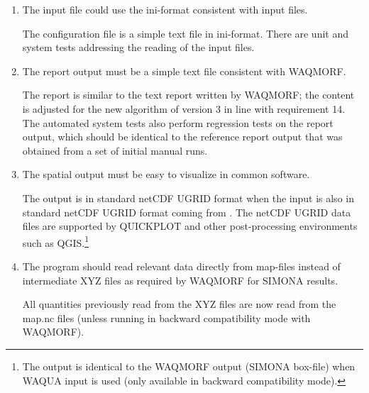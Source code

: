 \begin{enumerate}
\item \begin{requirement}
The input file could use the ini-format consistent with \dflowfm input files.
\end{requirement}
\begin{testmethod}
The \dfastmi configuration file is a simple text file in ini-format.
There are unit and system tests addressing the reading of the input files.
\end{testmethod}

\item \begin{requirement}
The report output must be a simple text file consistent with WAQMORF.
\end{requirement}
\begin{testmethod}
The report is similar to the text report written by WAQMORF; the content is adjusted for the new algorithm of \dfastmi version 3 in line with requirement 14.
The automated system tests also perform regression tests on the report output, which should be identical to the reference report output that was obtained from a set of initial manual runs.
\end{testmethod}

\item \begin{requirement}
The spatial output must be easy to visualize in common software.
\end{requirement}
\begin{testmethod}
The output is in standard netCDF UGRID format when the input is also in standard netCDF UGRID format coming from \dflowfm.
The netCDF UGRID data files are supported by QUICKPLOT and other post-processing environments such as QGIS.\footnote{The output is identical to the WAQMORF output (SIMONA box-file) when WAQUA input is used (only available in backward compatibility mode).}
\end{testmethod}

\item \begin{requirement}
The program should read relevant data directly from \dflowfm map-files instead of intermediate XYZ files as required by WAQMORF for SIMONA results.
\end{requirement}
\begin{testmethod}
All quantities previously read from the XYZ files are now read from the \dflowfm map.nc files (unless running in backward compatibility mode with WAQMORF).
\end{testmethod}


\end{enumerate}

